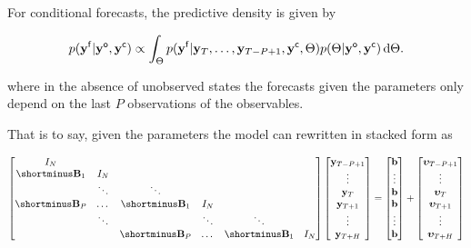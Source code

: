\documentclass[notitlepage,a4paper,12pt]{article}
\begin{document}
For conditional forecasts, the predictive density is given by 

\begin{equation}\label{eqn:preddens}    
    p(\mathbf{y^{\sf{f}}}|\mathbf{y^{\sf{o}}}, \mathbf{y^{\sf{c}}}) \propto \int_{\Theta} p(\mathbf{y^{\sf{f}}}|\mathbf{y}_T, \dots, \mathbf{y}_{T-P+1}, \mathbf{y^{\sf{c}}}, \Theta) p(\Theta|\mathbf{y^{\sf{o}}}, \mathbf{y^{\sf{c}}})\, \text{d}\Theta.
\end{equation}

where in the absence of unobserved states the forecasts given the parameters only depend on the last $P$ observations of the observables. 

That is to say, given the parameters the model can rewritten in stacked form as


\begin{equation*}
    \begin{bmatrix}
        I_N \\
        \shortminus\mathbf{B}_1 & I_N \\
        & \ddots & \ddots & \\
        \shortminus\mathbf{B}_{P} & \dots & \shortminus\mathbf{B}_1 & I_N & & \\
        & \ddots &  & \ddots & \ddots & \\
        & & \shortminus\mathbf{B}_{P} & \dots & \shortminus\mathbf{B}_1 & I_N       
    \end{bmatrix}
    \begin{bmatrix}
        \mathbf{y}_{T-P+1} \\
        \vdots \\
        \mathbf{y}_{T} \\
        \mathbf{y}_{T+1} \\
        \vdots \\
        \mathbf{y}_{T+H} 
    \end{bmatrix}
    =
    \begin{bmatrix}
        \mathbf{b} \\
        \vdots \\
        \mathbf{b} \\
        \mathbf{b} \\
        \vdots \\
        \mathbf{b} 
    \end{bmatrix}
    +
    \begin{bmatrix}
        \boldsymbol{\upsilon}_{T-P+1} \\
        \vdots \\
        \boldsymbol{\upsilon}_{T} \\
        \boldsymbol{\upsilon}_{T+1} \\
        \vdots \\
        \boldsymbol{\upsilon}_{T+H} 
    \end{bmatrix}
\end{equation*}
\end{document}
